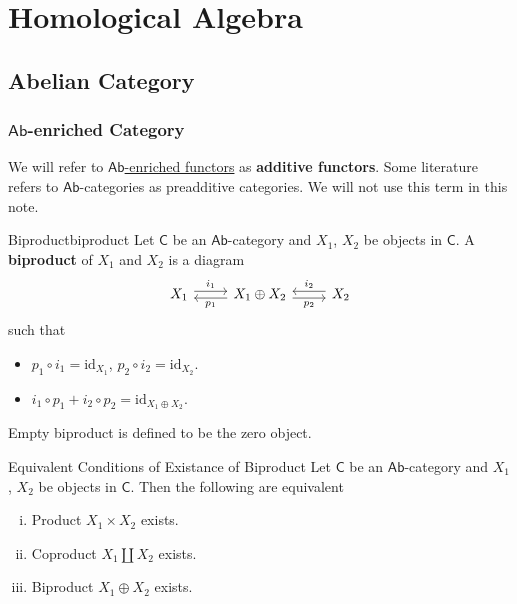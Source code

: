 \chapter{Homological Algebra}
\section{Abelian Category}

\subsection{$\mathsf{Ab}$-enriched Category}
We will refer to \hyperref[th:enriched_functor]{$\mathsf{Ab}$-enriched functors} as \textbf{additive functors}. Some literature refers to $\mathsf{Ab}$-categories as preadditive categories. We will not use this term in this note. 

\begin{definition}{Biproduct}{biproduct}
    Let $\mathsf{C}$ be an $\mathsf{Ab}$-category and $X_1$, $X_2$ be objects in $\mathsf{C}$. A \textbf{biproduct} of $X_1$ and $X_2$ is a diagram
    \[
    \begin{tikzcd}[ampersand replacement=\&]
            X_1 \arrow[r, "i_1", shift left] \& X_1\oplus X_2 \arrow[l, "p_1", shift left] \arrow[r, "p_2"', shift right] \& X_2 \arrow[l, "i_2"', shift right]
    \end{tikzcd}
    \]
    such that
    \begin{itemize}
        \item $p_1\circ i_1=\mathrm{id}_{X_1}$, $p_2\circ i_2=\mathrm{id}_{X_2}$.
        \item $i_1\circ p_1+ i_2\circ p_2=\mathrm{id}_{X_1\oplus X_2}$.
    \end{itemize}
    Empty biproduct is defined to be the zero object.
\end{definition}


\begin{proposition}{Equivalent Conditions of Existance of Biproduct}{}
    Let $\mathsf{C}$ be an $\mathsf{Ab}$-category and $X_1$, $X_2$ be objects in $\mathsf{C}$. Then the following are equivalent
    \begin{enumerate}[(i)]
        \item Product $X_1\times X_2$ exists.
        \item Coproduct $X_1\amalg X_2$ exists.
        \item Biproduct $X_1\oplus X_2$ exists.
    \end{enumerate}
\end{proposition}

